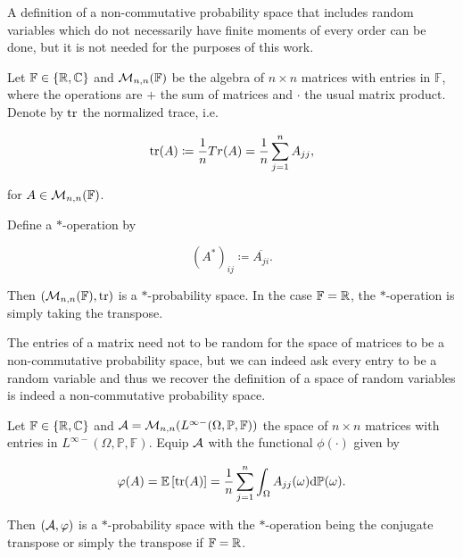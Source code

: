     A definition of a non-commutative probability space that includes random variables which do not necessarily have finite moments of every order can be done, but it is not needed for the purposes of this work. 

    \begin{example}
        Let $\mathbb F \in \{\mathbb R,\mathbb C\}$ and $\mathcal M_{n,n}(\mathbb F)$ be the algebra of $n\times n$ matrices with entries in $\mathbb F$, where the operations are $+$ the sum of matrices and $\cdot$ the usual matrix product. Denote by $\mathrm{tr}$ the normalized trace, i.e.

        \begin{equation*}
            \mathrm{tr}(A) \coloneqq \frac1n Tr(A) = \frac1n \sum_{j=1}^n A_{jj},
        \end{equation*}

        \noindent for $A \in \mathcal M_{n,n}(\mathbb F)$.

        Define a $*$-operation by

        \begin{equation*}
            (A^*)_{ij} \coloneqq \overline{A_{ji}}.
        \end{equation*}

        Then $(\mathcal M_{n,n}(\mathbb F),\mathrm{tr})$ is a $*$-probability space. In the case $\mathbb F = \mathbb R$, the $*$-operation is simply taking the transpose.
    \end{example}

    The entries of a matrix need not to be random for the space of matrices to be a non-commutative probability space, but we can indeed ask every entry to be a random variable and thus we recover the definition of a space of random variables is indeed a non-commutative probability space.

    \begin{example}
        Let  $\mathbb F \in \{\mathbb R,\mathbb C\}$ and $\mathcal A = \mathcal M_{n,n}(L^{\infty-}(\Omega,\mathbb P,\mathbb F))$ the space of $n\times n$ matrices with entries in $L^{\infty-}(\Omega,\mathbb P,\mathbb F)$. Equip $\mathcal A$ with the functional $\phi(\cdot)$ given by

        \begin{equation*}
            \varphi(A) = \mathbb E \left[  \mathrm{tr}(A)  \right] = \frac1n\sum_{j=1}^n \int_{\Omega} A_{jj}(\omega) \mathrm d \mathbb P(\omega).
        \end{equation*}

        Then $(\mathcal A, \varphi)$ is a $*$-probability space with the $*$-operation being the conjugate transpose or simply the transpose if $\mathbb F = \mathbb R$.
    \end{example}

